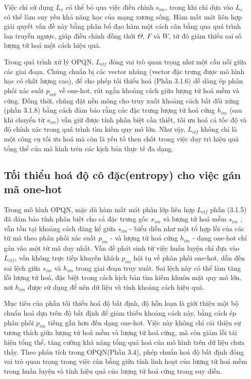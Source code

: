 Việc chỉ sử dụng $L_x$ có thể bỏ qua việc điều chỉnh $s_{im}$, trong khi chỉ dựa vào $L_s$ có thể làm suy yếu khả năng học của mạng xương sống. Hàm mất mát liên hợp giải quyết vấn đề này bằng phân bổ đạo hàm một cách cân bằng qua quá trình lan truyền ngược, giúp điều chỉnh đồng thời $ \Theta $, $F$ và $W$, từ đó giảm thiểu sai số lượng tử hoá một cách hiệu quả.

Trong quá trình xử lý OPQN, $L_{clf}$ đóng vai trò quan trọng như một cầu nỗi giữa các giai đoạn. Chúng chuẩn bị các vector nhúng (vector đặc trưng được mô hình học có chất lượng cao), để cho phép tối thiểu hoá (Phần 3.1.6) dễ dàng ép phân phối xác suất $p_{mk}$ về one-hot, rút ngắn khoảng cách giữa lượng tử hoá mềm và cứng. Đồng thời, chúng đặt nền móng cho truy xuất khoảng cách bất đối xứng (phần 3.1.8) bằng cách đảm bảo rằng các đặc trưng lượng tử hoá cứng $h_{im}$ (sau khi chuyển từ $s_{im}$) vẫn giữ được tính phân biệt cần thiết, tối ưu hoá cả tốc độ và độ chính xác trong quá trình tìm kiếm quy mô lớn. Như vậy, $L_{clf}$ không chỉ là một công cụ tối ưu hoá mà còn là yếu tố then chốt trong việc duy trì hiệu quả tổng thể của mô hình trên các kịch bản thực tế đa dạng.

\subsection{Tối thiểu hoá độ cô đặc(entropy) cho việc gán mã one-hot}
Trong mô hình OPQN, mặc dù hàm mất mát phân lớp liên hợp $L_{clf}$ phần (3.1.5) đã đảm bảo tính phân biệt cho cả đặc trưng gốc $x_{im}$ và lượng tử hoá mềm $s_{im}$ , vẫn tồn tại khoảng cách đáng kể giữa $s_{im}$ - biểu diễn như một tổ hợp lồi của các từ mã theo phân phối xác suất $p_{im}$ - và lượng tử hoá cứng $h_{im}$ - dạng one-hot chỉ gán vào một từ mã duy nhất. Vấn đề phát sinh từ việc huấn luyện chỉ đựa vào $L_{clf}$, vốn không trực tiếp khuyến khích $p_{im}$ hội tụ về phân phối one-hot, dẫn đến sai lệch giữa $s_{im}$ và $h_{im}$ trong giai đoạn truy xuất. Sai lệch này có thể làm tăng lỗi lượng tử hoá, đặc biệt trong cách kịch bản tìm kiếm khuôn mặt quy mô lớn, nơi $h_{im}$ được sử dụng để nén dữ liệu và tính khoảng cách hiệu quả.

Mục tiêu của phần tối thiểu hoá độ bất định, độ hỗn loạn là giới thiệu một bộ chuẩn hoá dựa trên độ bất định để giảm thiểu khoảng cách này, bằng cách ép phân phối $p_{im}$ tiếng gần hơn đến dạng one-hot. Việc này không chỉ cải thiện sự tương thích giữa lượng tử hoá mềm và lượng tử hoá cứng, mà còn giảm lỗi tái hiện tổng thể, tăng cường khả năng tổng quá hoá của mô hình trên dữ liệu chưa thấy. Theo phân tích trong OPQN(Phần 3.4), phép chuẩn hoá độ bất định đóng vai trò quan trọng trong việc cân bằng giữa tính linh hoạt của lượng tử hoá mềm trong huấn luyện và tính hiệu quả của lượng tử hoá cứng trong suy diễn.

